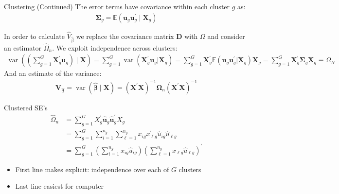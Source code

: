 \begin{frame}{Clustering (Continued)}
The error terms have covariance within each cluster $g$ as:
\begin{align*}
 \boldsymbol{\Sigma}_ { g } = \mathbb { E } \left( \mathbf{u} _ { g }  \mathbf{ u } _ { g } ^ { \prime } \mid \boldsymbol { X } _ { g } \right)
\end{align*}

In order to calculate $\widehat{V}_{\widehat{\beta}}$ we replace the covariance matrix $\mathbf{D}$ with $\Omega$ and consider an estimator $\widehat{\Omega}_n$. We exploit \alert{independence across clusters}:
\begin{align*}
\operatorname { var } \left( \left( \sum _ { g = 1 } ^ { G } \boldsymbol { X } _ { g } ^ { \prime } \mathbf{u}_ { g } \right) \mid \boldsymbol { X } \right) = \sum _ { g = 1 } ^ { G } \operatorname { var } \left( \boldsymbol { X } _ { g } ^ { \prime } \boldsymbol { u } _ { g } | \boldsymbol { X } _ { g } \right)
= \sum _ { g = 1 } ^ { G } \boldsymbol { X } _ { g } ^ { \prime } \mathbb { E } \left( \boldsymbol { u } _ { g } \boldsymbol { u } _ { g } ^ { \prime } | \boldsymbol { X } _ { g } \right) \boldsymbol { X } _ { g }
= \sum _ { g = 1 } ^ { G } \boldsymbol { X } _ { g } ^ { \prime } \boldsymbol { \Sigma } _ { g } \mathbf { X } _ { g } 
 \equiv \Omega_N
\end{align*}
And an estimate of the variance:
\begin{align*}
\boldsymbol { V } _ { \widehat { \boldsymbol { \beta } } } = \operatorname { var } ( \widehat { \boldsymbol { \beta } } \mid  \boldsymbol { X } )
= \left( \mathbf { X } ^ { \prime } \mathbf { X } \right) ^ { - 1 } \boldsymbol { \Omega } _ { n } \left( \mathbf { X } ^ { \prime } \mathbf { X } \right) ^ { - 1 }
\end{align*}
\end{frame}


\begin{frame}{Clustered SE's}
\begin{align*}
\widehat { \Omega } _ { n } &= \sum _ { g = 1 } ^ { G } X _ { g } ^ { \prime } \widehat {\mathbf{ u }} _ { g }\widehat {\mathbf{ u }}_{g} ^ { \prime } X _ { g }\\
&= \sum _ { g = 1 } ^ { G } \sum _ { i = 1 } ^ { n _ { g } } \sum _ { \ell = 1 } ^ { n _ { g } } x _ { i g } x _ { \ell g } ^ { \prime } \widehat { u } _ { i g } \widehat { u } _ { \ell g }\\
&= \sum _ { g = 1 } ^ { G } \left( \sum _ { i = 1 } ^ { n _ { g } } x _ { i g } \widehat { u } _ { i g } \right) \left( \sum _ { \ell = 1 } ^ { n _ { g } } x _ { \ell g } \widehat { u } _ { \ell g } \right) ^ { \prime }
\end{align*}
\begin{itemize}
\item First line makes explicit: independence over each of $G$ clusters
\item Last line easiest for computer
\end{itemize}
\end{frame}

